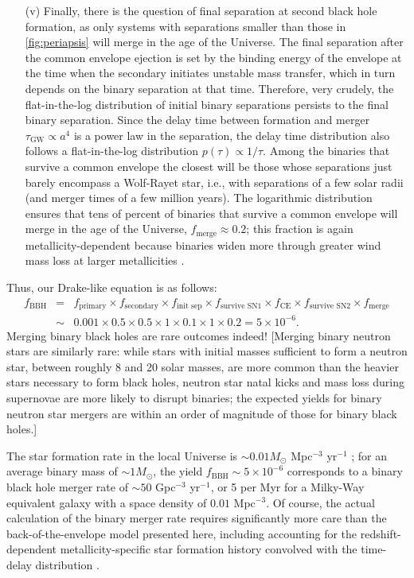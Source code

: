 \documentclass[review]{elsarticle}
\begin{document}
\begin{enumerate}
\item[(v)]  Finally, there is the question of final separation at second black hole formation, as only systems with separations smaller than those in \autoref{fig:periapsis} will merge in the age of the Universe.  The final separation after the common envelope ejection is set by the binding energy of the envelope at the time when the secondary initiates unstable mass transfer, which in turn depends on the binary separation at that time.  Therefore, very crudely, the flat-in-the-log distribution of initial binary separations persists to the final binary separation.  Since the delay time between formation and merger $\tau_\textrm{GW} \propto a^4$ is a power law in the separation, the delay time distribution also follows a flat-in-the-log distribution $p(\tau) \propto 1/\tau$.  Among the binaries that survive a common envelope the closest will be those whose separations just barely encompass a Wolf-Rayet star, i.e., with separations of a few solar radii (and merger times of a few million years).  The logarithmic distribution ensures that tens of percent of binaries that survive a common envelope will merge in the age of the Universe, $f_\textrm{merge} \approx 0.2$; this fraction is again metallicity-dependent because binaries widen more through greater wind mass loss at larger metallicities \citep{Neijssel:2019}. \end{enumerate}

Thus, our Drake-like equation is as follows:
\begin{eqnarray}
f_\textrm{BBH} &=& f_\textrm{primary} \times f_\textrm{secondary} \times f_\textrm{init sep} \times f_\textrm{survive SN1} \times f_\textrm{CE} \times f_\textrm{survive SN2} \times f_\textrm{merge} \nonumber \\
 & \sim & 0.001 \times 0.5 \times 0.5 \times 1 \times 0.1 \times 1 \times 0.2 = 5 \times 10^{-6}.
\end{eqnarray}
Merging binary black holes are rare outcomes indeed!  [Merging binary neutron stars are similarly rare: while stars with initial masses sufficient to form a neutron star, between roughly 8 and 20 solar masses, are more common than the heavier stars necessary to form black holes, neutron star natal kicks and mass loss during supernovae are more likely to disrupt binaries; the expected yields for binary neutron star mergers are within an order of magnitude of those for binary black holes.]

The star formation rate in the local Universe is $\sim 0.01 M_\odot$ Mpc$^{-3}$ yr$^{-1}$ \citep{MadauDickinson:2014}; for an average binary mass of $\sim 1 M_\odot$, the yield $f_\textrm{BBH} \sim 5 \times 10^{-6}$ corresponds to a binary black hole merger rate of $\sim 50$ Gpc$^{-3}$ yr$^{-1}$, or 5 per Myr for a Milky-Way equivalent galaxy with a space density of $0.01$ Mpc$^{-3}$.  Of course, the actual calculation of the binary merger rate requires significantly more care than the back-of-the-envelope model presented here, including accounting for the redshift-dependent metallicity-specific star formation history convolved with the time-delay distribution \citep{Belczynski:2010,Mapelli:2017,Klencki:2018,Chruslinska:2019,Neijssel:2019,ChruslinskaNelemans:2019,Tang:2020,Broekgaarden:2021,Santoliquido:2021}.  
\end{document}
